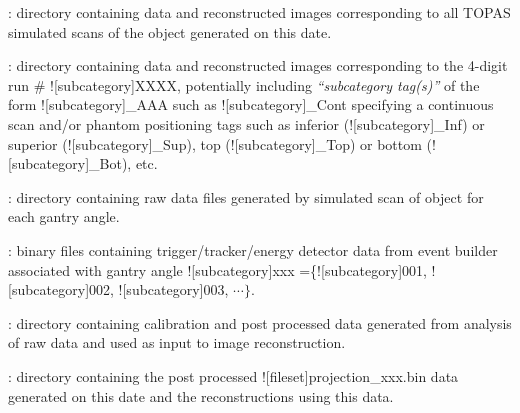 \begin{tcbenvironment}
\begin{tcbparagraph}
\begin{ThinEnum}
\begin{ThinEnum}
\begin{ThinEnum}
\begin{ThinEnum}
\begin{ThinEnum}
\begin{ThinEnum}
\begin{ThinEnum}
                            \end{ThinEnum}
                        \end{ThinEnum}
                    \end{ThinEnum}
                \end{ThinEnum}
                \item {} : directory containing data and reconstructed images corresponding to all TOPAS simulated scans of the object generated on this date.
                \begin{ThinEnum}
                    \item {} : directory containing data and reconstructed images corresponding to the 4-digit run \# \docentry![subcategory]{XXXX}, potentially including \emph{``subcategory tag(s)''} of the form \docentry![subcategory]{\_AAA} such as  \docentry![subcategory]{\_Cont} specifying a continuous scan and/or phantom positioning tags such as inferior (\docentry![subcategory]{\_Inf}) or superior (\docentry![subcategory]{\_Sup}), top (\docentry![subcategory]{\_Top}) or bottom (\docentry![subcategory]{\_Bot}), etc.
                    \begin{ThinEnum}
                        \item {} : directory containing raw data files generated by simulated scan of object for each gantry angle.
                        \begin{ThinEnum}
                            \item {} : binary files containing trigger/tracker/energy detector data from event builder associated with gantry angle \docentry![subcategory]{xxx} =\{\docentry![subcategory]{001}, \docentry![subcategory]{002}, \docentry![subcategory]{003}, $\cdots\}$.
                        \end{ThinEnum}
                        \item {} : directory containing calibration and post processed data generated from analysis of raw data and used as input to image reconstruction.
                        \begin{ThinEnum}
                            \item {} : directory containing the post processed \docentry![fileset]{projection\_xxx.bin} data generated on this date and the reconstructions using this data.
                            \begin{ThinEnum}

\end{ThinEnum}
\end{ThinEnum}
\end{ThinEnum}
\end{ThinEnum}
\end{ThinEnum}
\end{ThinEnum}
\end{ThinEnum}
\end{tcbparagraph}
\end{tcbenvironment}
